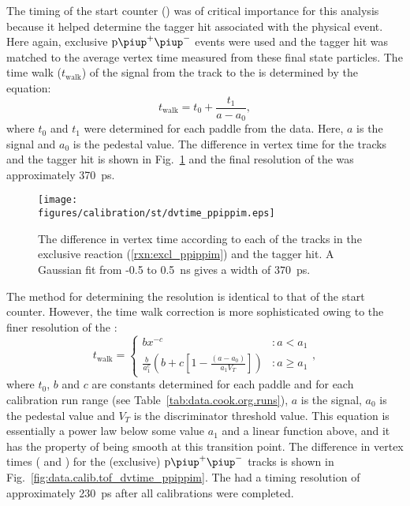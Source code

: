 The timing of the start counter () was of critical importance for this analysis because it helped determine the tagger hit associated with the physical event. Here again, exclusive $\mathrm{p \piup^+ \piup^-}$ events were used and the tagger hit was matched to the average vertex time measured from these final state particles. The time walk ($t_\mathrm{walk}$) of the signal from the track to the  is determined by the equation:
\begin{equation}
    t_\mathrm{walk} = t_0 + \frac{t_{1}}{a - a_0},
    \label{eqn:st_timewalk}
\end{equation}
where $t_0$ and $t_1$ were determined for each paddle from the data. Here, $a$ is the  signal and $a_0$ is the  pedestal value. The difference in  vertex time for the tracks and the tagger hit is shown in Fig.~\ref{fig:data.calib.st_dvtime_ppippim} and the final resolution of the  was approximately 370~ps.


\begin{figure}\begin{center}
\texttt{[image: \\figures/calibration/st/dvtime\_ppippim.eps]}
\caption[ Timing Resolution]{\label{fig:data.calib.st_dvtime_ppippim}The difference in  vertex time according to each of the tracks in the exclusive reaction (\ref{rxn:excl_ppippim}) and the tagger hit. A Gaussian fit from -0.5 to 0.5~ns gives a width of $370$~ps.}
\end{center}\end{figure}

The method for determining the  resolution is identical to that of the start counter. However, the time walk correction is more sophisticated owing to the finer resolution of the :
\begin{equation}
    t_\mathrm{walk} = \left\{
      \begin{array}{ll}
            b x^{-c}
                &: a < a_1 \\
            \frac{b}{a_1^c}
                \left( b + c \left[ 1
                - \frac{\left( a - a_0 \right)}
                    {a_1 V_T}
                \right] \right)
                &: a \geq a_1
      \end{array}
      \right. ,
\end{equation}
where $t_0$, $b$ and $c$ are constants determined for each  paddle and for each calibration run range (see Table~\ref{tab:data.cook.org.runs}), $a$ is the   signal, $a_0$ is the  pedestal value and $V_T$ is the discriminator threshold value. This equation is essentially a power law below some  value $a_1$ and a linear function above, and it has the property of being smooth at this transition point. The difference in vertex times ( and ) for the (exclusive) $\mathrm{p \piup^+ \piup^-}$ tracks is shown in Fig.~\ref{fig:data.calib.tof_dvtime_ppippim}. The  had a timing resolution of approximately 230~ps after all calibrations were completed.

